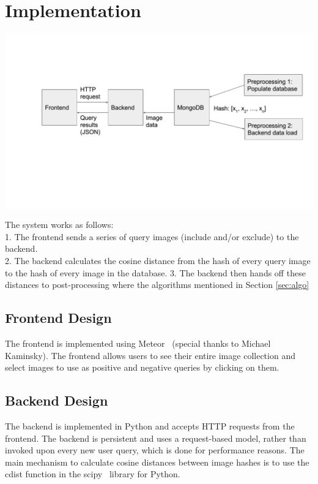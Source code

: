 \section{Implementation}
\begin{minipage}{1.0\columnwidth}
    \centering
    \includegraphics[width=0.9\columnwidth]{figs/system-design}
    \label{fig:system-design}
\end{minipage}
The system works as follows:\\
    1. The frontend sends a series of query images (include and/or exclude) to the backend. \\
    2. The backend calculates the cosine distance from the hash of every query image to the hash of every image in the database.
    3. The backend then hands off these distances to post-processing where the algorithms mentioned in Section \ref{sec:algo}

\subsection{Frontend Design}
The frontend is implemented using Meteor~\cite{coleman2015discover} (special thanks to Michael Kaminsky).
The frontend allows users to see their entire image collection and select images to use as positive
and negative queries by clicking on them.

\subsection{Backend Design}
The backend is implemented in Python and accepts HTTP requests from the frontend.
The backend is persistent and uses a request-based model, rather than invoked upon every new user query,
which is done for performance reasons.
The main mechanism to calculate cosine distances between image hashes is to use the cdist function in the
scipy~\cite{jones2001open} library for Python.

